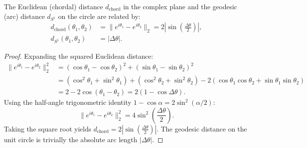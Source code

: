 \begin{lemma}
\label{lem:chord_vs_arc}
The Euclidean (chordal) distance $d_{\mathrm{chord}}$ in the complex plane and the geodesic (arc) distance $d_{S^1}$ on the circle are related by:
\begin{align}
    d_{\mathrm{chord}}(\theta_1, \theta_2) &= \|e^{i\theta_1} - e^{i\theta_2}\|_2 = 2 \left|\sin\left(\frac{\Delta\theta}{2}\right)\right|, \\
    d_{S^1}(\theta_1, \theta_2) &= |\Delta\theta|.
\end{align}
\end{lemma}
\begin{proof}
Expanding the squared Euclidean distance:
\begin{align}
    \|e^{i\theta_1} - e^{i\theta_2}\|_2^2 &= (\cos\theta_1 - \cos\theta_2)^2 + (\sin\theta_1 - \sin\theta_2)^2 \\
    &= (\cos^2\theta_1 + \sin^2\theta_1) + (\cos^2\theta_2 + \sin^2\theta_2) - 2(\cos\theta_1\cos\theta_2 + \sin\theta_1\sin\theta_2) \\
    &= 2 - 2\cos(\theta_1 - \theta_2) = 2(1 - \cos\Delta\theta).
\end{align}
Using the half-angle trigonometric identity $1 - \cos\alpha = 2\sin^2(\alpha/2)$:
\begin{equation}
    \|e^{i\theta_1} - e^{i\theta_2}\|_2^2 = 4\sin^2\left(\frac{\Delta\theta}{2}\right).
\end{equation}
Taking the square root yields $d_{\mathrm{chord}} = 2 \left|\sin\left(\frac{\Delta\theta}{2}\right)\right|$. The geodesic distance on the unit circle is trivially the absolute arc length $|\Delta\theta|$.
\end{proof}


